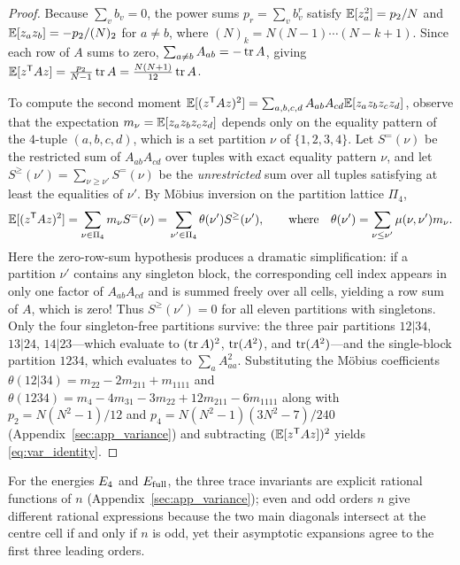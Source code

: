 \begin{proof}
Because $\sum_vb_v=0$, the power sums $p_r=\sum_vb_v^r$ satisfy $\mathbb{E}[z_a^2]=p_2/N$ and $\mathbb{E}[z_az_b]=-p_2/(N)_2$ for $a\ne b$, where $(N)_k=N(N-1)\cdots(N-k+1)$. Since each row of $A$ sums to zero, $\sum_{a\ne b}A_{ab}=-\operatorname{tr} A$, giving $\mathbb{E}[z^{\mathsf T}Az]=\frac{p_2}{N-1}\operatorname{tr} A=\frac{N(N+1)}{12}\operatorname{tr} A$.

To compute the second moment $\mathbb{E}[(z^{\mathsf T}Az)^2]=\sum_{a,b,c,d}A_{ab}A_{cd}\mathbb{E}[z_az_bz_cz_d]$, observe that the expectation $m_\nu=\mathbb{E}[z_az_bz_cz_d]$ depends only on the equality pattern of the $4$-tuple $(a,b,c,d)$, which is a set partition $\nu$ of $\{1,2,3,4\}$. Let $S^=(\nu)$ be the restricted sum of $A_{ab}A_{cd}$ over tuples with exact equality pattern $\nu$, and let $S^\ge(\nu')=\sum_{\nu\ge\nu'}S^=(\nu)$ be the \emph{unrestricted} sum over all tuples satisfying at least the equalities of $\nu'$. By M\"obius inversion on the partition lattice $\Pi_4$,
\[
\mathbb{E}[(z^{\mathsf T}Az)^2]=\sum_{\nu\in\Pi_4}m_\nu S^=(\nu)=\sum_{\nu'\in\Pi_4}\theta(\nu')S^\ge(\nu'),\qquad\text{where}\quad \theta(\nu')=\sum_{\nu\le\nu'}\mu(\nu,\nu')m_\nu.
\]
Here the zero-row-sum hypothesis produces a dramatic simplification: if a partition $\nu'$ contains any singleton block, the corresponding cell index appears in only one factor of $A_{ab}A_{cd}$ and is summed freely over all cells, yielding a row sum of $A$, which is zero! Thus $S^\ge(\nu')=0$ for all eleven partitions with singletons. Only the four singleton-free partitions survive: the three pair partitions $12|34$, $13|24$, $14|23$—which evaluate to $(\operatorname{tr} A)^2$, $\operatorname{tr}(A^2)$, and $\operatorname{tr}(A^2)$—and the single-block partition $1234$, which evaluates to $\sum_a A_{aa}^2$. Substituting the M\"obius coefficients $\theta(12|34)=m_{22}-2m_{211}+m_{1111}$ and $\theta(1234)=m_4-4m_{31}-3m_{22}+12m_{211}-6m_{1111}$ along with $p_2=N(N^2-1)/12$ and $p_4=N(N^2-1)(3N^2-7)/240$ (Appendix~\ref{sec:app_variance}) and subtracting $(\mathbb{E}[z^{\mathsf T}Az])^2$ yields \eqref{eq:var_identity}.
\end{proof}

For the energies $E_4$ and $E_{\mathrm{full}}$, the three trace invariants are explicit rational functions of $n$ (Appendix~\ref{sec:app_variance}); even and odd orders $n$ give different rational expressions because the two main diagonals intersect at the centre cell if and only if $n$ is odd, yet their asymptotic expansions agree to the first three leading orders.

